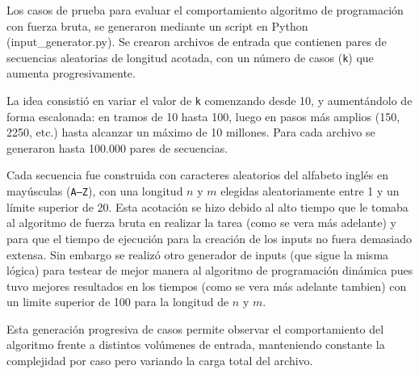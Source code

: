 

Los casos de prueba para evaluar el comportamiento algoritmo de programación con fuerza bruta, se generaron mediante un script en Python (input\_generator.py). Se crearon archivos de entrada que contienen pares de secuencias aleatorias de longitud acotada, con un n\'umero de casos (\texttt{k}) que aumenta progresivamente.

La idea consisti\'o en variar el valor de \texttt{k} comenzando desde 10, y aument\'andolo de forma escalonada: en tramos de 10 hasta 100, luego en pasos m\'as amplios (150, 2250, etc.) hasta alcanzar un m\'aximo de 10 millones. Para cada archivo se generaron hasta 100.000 pares de secuencias.

Cada secuencia fue construida con caracteres aleatorios del alfabeto ingl\'es en may\'usculas (\texttt{A--Z}), con una longitud $n$ y $m$ elegidas aleatoriamente entre 1 y un l\'imite superior de 20. Esta acotaci\'on se hizo debido al alto tiempo que le tomaba al algoritmo de fuerza bruta en realizar la tarea (como se vera más adelante) y para que el tiempo de ejecución para la creación de los inputs no fuera demasiado extensa. Sin embargo se realizó otro generador de inputs (que sigue la misma lógica) para testear de mejor manera al algoritmo de programación dinámica pues tuvo mejores resultados en los tiempos (como se vera más adelante tambien) con un limite superior de 100 para la longitud de $n$ y $m$.

Esta generaci\'on progresiva de casos permite observar el comportamiento del algoritmo frente a distintos vol\'umenes de entrada, manteniendo constante la complejidad por caso pero variando la carga total del archivo.


